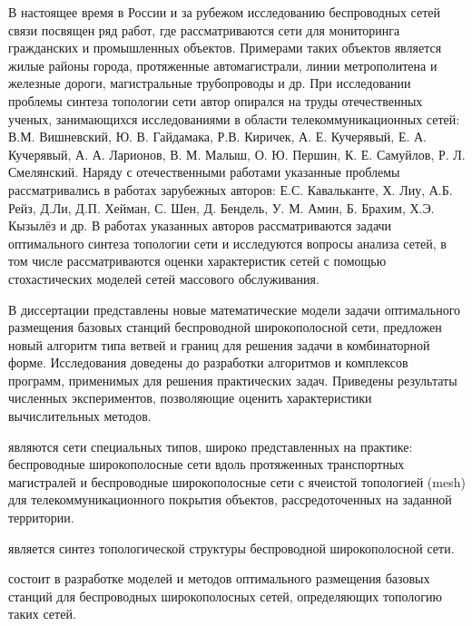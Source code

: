 {\progress} В настоящее время в России и за рубежом исследованию беспроводных сетей связи посвящен ряд работ, где рассматриваются сети для мониторинга гражданских  и промышленных объектов. Примерами таких объектов является жилые районы города, протяженные автомагистрали, линии метрополитена и железные дороги, магистральные трубопроводы и др. При исследовании проблемы синтеза топологии сети автор опирался на труды отечественных ученых, занимающихся исследованиями в области телекоммуникационных сетей: В.М. Вишневский, Ю. В. Гайдамака, Р.В. Киричек, А. Е. Кучерявый, Е. А. Кучерявый, А. А. Ларионов, В. М. Малыш,  О. Ю. Першин, К. Е. Самуйлов, Р. Л. Смелянский. Наряду с отечественными работами указанные проблемы рассматривались в работах зарубежных авторов: Е.С. Кавальканте, Х. Лиу, А.Б. Рейз, Д.Ли, Д.П. Хейман, С. Шен, Д. Бендель, У. М. Амин, Б. Брахим, Х.Э. Кызылёз и др. В работах указанных авторов рассматриваются задачи оптимального синтеза топологии сети и исследуются вопросы анализа сетей, в том числе рассматриваются оценки характеристик сетей с помощью стохастических моделей сетей массового обслуживания. 

В диссертации представлены новые математические модели задачи оптимального размещения базовых станций беспроводной широкополосной сети, предложен новый алгоритм типа ветвей и границ для решения задачи в комбинаторной форме.
Исследования доведены до разработки алгоритмов и комплексов программ, применимых для решения практических задач. Приведены результаты численных экспериментов, позволяющие оценить характеристики вычислительных методов.


{\objectresearch} являются сети специальных типов, широко представленных на практике: беспроводные широкополосные сети вдоль протяженных транспортных магистралей и беспроводные широкополосные сети с ячеистой топологией (mesh) для телекоммуникационного покрытия объектов, рассредоточенных на заданной территории.



{\subjectresearch} является синтез топологической структуры беспроводной широкополосной сети.

{\aim} состоит в разработке моделей и методов оптимального размещения базовых станций для беспроводных широкополосных сетей, определяющих топологию таких сетей.

